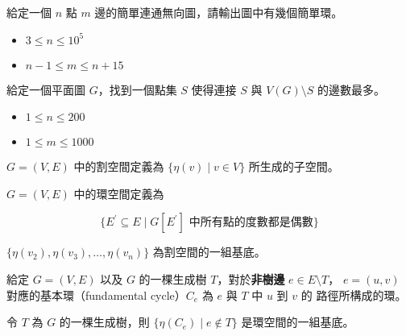 \documentclass[standalone]{beamer}
\begin{document}
\begin{frame}{}
  \begin{problem}
    給定一個 $n$ 點 $m$ 邊的簡單連通無向圖，請輸出圖中有幾個簡單環。

    \begin{itemize}
      \item $3 \leq n \leq 10^5$
      \item $n - 1 \leq m \leq n + 15$
    \end{itemize}
  \end{problem}

   {
    \begin{problem}
      給定一個平面圖 $G$，找到一個點集 $S$ 使得連接 $S$ 與 $V(G) \setminus S$ 的邊數最多。

      \begin{itemize}
        \item $1 \leq n \leq 200$
        \item $1 \leq m \leq 1000$
      \end{itemize}
    \end{problem}
  }
\end{frame}

\begin{frame}{}
   {
    \begin{definition}
      $G = (V, E)$ 中的割空間定義為 $\{\eta(v) \mid v \in V\}$ 所生成的子空間。
    \end{definition}
  }
   {
    \begin{definition}
      $G = (V, E)$ 中的環空間定義為

      \[ \{E^\prime \subseteq E \mid G[E^\prime] \text{ 中所有點的度數都是偶數}\} \]
    \end{definition}
  }
\end{frame}

\begin{frame}{}
   {
    \begin{lemma}
      $\{\eta(v_2), \eta(v_3), \ldots, \eta(v_n)\}$ 為割空間的一組基底。
    \end{lemma}
  }
   {
    \begin{definition}[基本環]
      給定 $G = (V, E)$ 以及 $G$ 的一棵生成樹 $T$，對於\textbf{非樹邊} $e \in E \setminus T$，
      $e = (u, v)$ 對應的基本環（fundamental cycle）$C_e$ 為 $e$ 與 $T$ 中 $u$ 到 $v$ 的
      路徑所構成的環。
    \end{definition}
  }
   {
    \begin{lemma}
      令 $T$ 為 $G$ 的一棵生成樹，則 $\{\eta(C_e) \mid e \notin T\}$ 是環空間的一組基底。
    \end{lemma}
  }
\end{frame}
\end{document}
